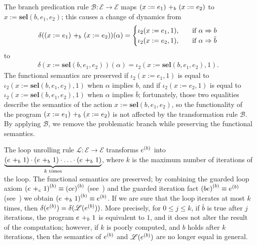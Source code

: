 The branch predication rule $\mathscr{B}\colon \mathscr{E}\rightarrow \mathscr{E}$ maps $\branch{b}{(x:=e_1)}{(x:=e_2)}$ to $x:=\textbf{sel}(b,e_1,e_2)$; this causes a change of dynamics from
\begin{align*}
    \delta(\branch{b}{(x:=e_1)}{(x:=e_2)})(\alpha)=
    \begin{cases}
        \iota_2(x:=e_1,1),&\quad\text{if $\alpha \Rightarrow b$}\\
        \iota_2(x:=e_2,1),&\quad\text{if $\alpha \Rightarrow \bar{b}$}\\
    \end{cases}
\end{align*}
to
\begin{align*}
    \delta(x:=\textbf{sel}(b,e_1,e_2))(\alpha)=\iota_2(x:=\textbf{sel}(b,e_1,e_2),1).
\end{align*}
The functional semantics are preserved if $\iota_2(x:=e_1,1)$ is equal to $\iota_2(x:=\textbf{sel}(b,e_1,e_2),1)$ when $\alpha$ implies $b$, and if $\iota_2(x:=e_2,1)$ is equal to $\iota_2(x:=\textbf{sel}(b,e_1,e_2),1)$ when $\alpha$ implies $\bar{b}$; fortunately, those two equalities describe the semantics of the action $x:=\textbf{sel}(b,e_1,e_2)$, so the functionality of the program $\branch{b}{(x:=e_1)}{(x:=e_2)}$ is not affected by the transformation rule $\mathscr{B}$. By applying $\mathscr{B}$, we remove the problematic branch while preserving the functional semantics.

The loop unrolling rule $\mathscr{L}\colon \mathscr{E}\rightarrow \mathscr{E}$ transforms $\iterate{b}{e}$ into $\underbrace{\left(\branch{b}{e}{1}\right)\cdot\left(\branch{b}{e}{1}\right)\cdot\ldots\cdot\left(\branch{b}{e}{1}\right)}_\text{$k$ times}$, where $k$ is the maximum number of iterations of the loop. The functional semantics are preserved; by combining the guarded loop axiom $\iterate{b}{(\branch{c}{e}{1})}\equiv \iterate{b}{(ce)}$ (see~\cite[Figure 1, W2]{GKAT}) and the guarded iteration fact $\iterate{b}{(be)}\equiv \iterate{b}{e}$ (see~\cite[Figure 2, W4']{GKAT}) we obtain $\iterate{b}{(\branch{b}{e}{1})}\equiv \iterate{b}{e}$. If we are sure that the loop iterates at most $k$ times, then $\delta(\iterate{b}{e})=\delta(\mathscr{L}(\iterate{b}{e}))$. More precisely, for $0\leq j\leq k$, if $\bar{b}$ is true after $j$ iterations, the program $\branch{b}{e}{1}$ is equivalent to $1$, and it does not alter the result of the computation; however, if $k$ is poorly computed, and $b$ holds after $k$ iterations, then the semantics of $\iterate{b}{e}$ and $\mathscr{L}(\iterate{b}{e})$ are no longer equal in general.


